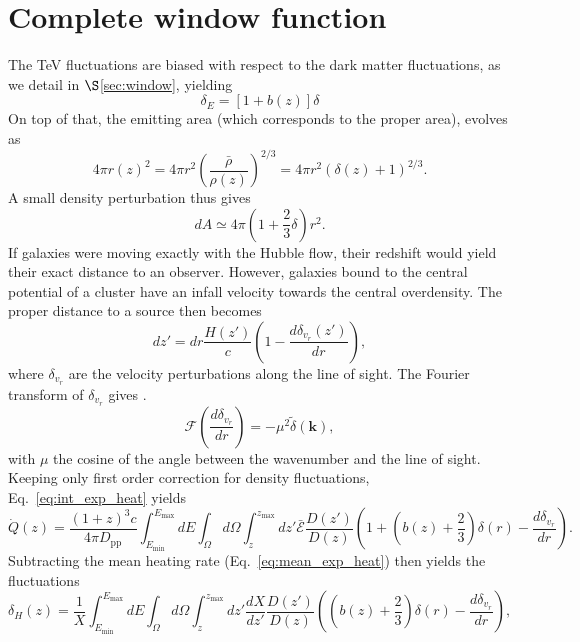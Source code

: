 \documentclass[numberedappendix]{emulateapj}
\begin{document}
\section{Complete window function}
The TeV fluctuations are biased with respect to the dark matter fluctuations, as we detail in $\S$\ref{sec:window}, yielding
\begin{equation}
\delta_E=[1+b(z)]\delta
\label{eq:bias}
\end{equation}
On top of that, the emitting area (which corresponds to the proper area), evolves as
\begin{equation}
\label{eq:emitting_area}
4\pi r(z)^2=4\pi r^2\left(\frac{\bar{\rho}}{\rho(z)}\right)^{2/3}=4\pi r^2(\delta(z)+1)^{2/3}.
\end{equation}
A small density perturbation thus gives
\begin{equation}
\label{eq:pert_area}
dA\simeq 4\pi \left(1+\frac{2}{3}\delta\right)r^2.
\end{equation}
If galaxies were moving exactly with the Hubble flow, their redshift would yield their exact distance to an observer. However, galaxies bound to the central potential of a cluster have an infall velocity towards the central overdensity. The proper distance to a source then becomes
\begin{equation}
\label{eq:vel_perturb}
dz'=dr\frac{H(z')}{c}\left(1-\frac{d\delta_{v_r}(z')}{dr}\right),
\end{equation}
where $\delta_{v_r}$ are the velocity perturbations along the line of sight. The Fourier transform of $\delta_{v_r}$ gives \citep{1987MNRAS.227....1K}.
\begin{equation}
\label{eq:kaiser2}
\mathcal{F}\left(\frac{d\delta_{v_r}}{dr}\right)=-\mu^2\tilde{\delta}(\mathbf{k}),
\end{equation}
with $\mu$ the cosine of the angle between the wavenumber and the line of sight.
Keeping only first order correction for density fluctuations, Eq.~\eqref{eq:int_exp_heat} yields
\begin{equation}
\label{eq:mean_heat0}
\dot{Q}(z)=\frac{(1+z)^3c}{4\pi D_{\mathrm{pp}}}\int_{E_{\mathrm{min}}}^{E_{\mathrm{max}}} dE\int_{\Omega}d\Omega\int_z^{z_{\mathrm{max}}} dz'\mathcal{\bar{E}}\frac{D(z')}{D(z)}\left(1+\left(b(z)+\frac{2}{3}\right) \delta(r) -\frac{d\delta_{v_r}}{dr}\right).
\end{equation}
Subtracting the mean heating rate (Eq.~\eqref{eq:mean_exp_heat}) then yields the fluctuations
\begin{equation}
\label{eq:heat_fluc0}
\delta_H(z)=\frac{1}{X}\int_{E_{\mathrm{min}}}^{E_{\mathrm{max}}} dE\int_{\Omega}d\Omega\int_z^{z_{\mathrm{max}}}dz'\frac{dX}{dz'}\frac{D(z')}{D(z)}\left(\left(b(z)+\frac{2}{3}\right) \delta(r) -\frac{d\delta_{v_r}}{dr}\right),
\end{equation}
\end{document}
